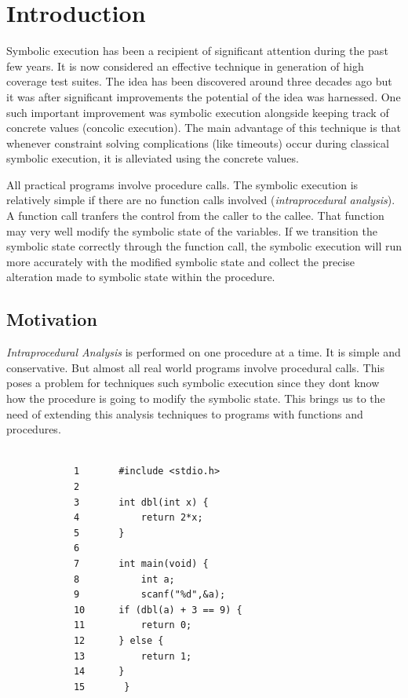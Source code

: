 \documentclass[12pt,oneside]{book}
\begin{document}
\mainmatter


\chapter{Introduction}


\hspace {0.4 cm}
Symbolic execution has been a recipient of significant attention during the past few years. It is now considered an effective technique in generation of high coverage test suites. The idea has been discovered around three decades ago but it was after significant improvements the potential of the idea was harnessed. One such important improvement was symbolic execution alongside keeping track of concrete values (concolic execution)\cite{decadeslater}. The main advantage of this technique is that whenever constraint solving complications (like timeouts) occur during classical symbolic execution, it is alleviated using the concrete values.

All practical programs involve procedure calls. The symbolic execution is relatively simple if there are no function calls involved (\textit{intraprocedural analysis}). A function call tranfers the control from the caller to the callee. That function may very well modify the symbolic state of the variables. If we transition the symbolic state correctly through the function call, the symbolic execution will run more accurately with the modified symbolic state and collect the precise alteration made to symbolic state within the procedure.    


\section{Motivation}
\textit{Intraprocedural Analysis} is performed on one procedure at a time. It is simple and conservative. But almost all real world programs involve procedural calls. This poses a problem for techniques such symbolic execution since they dont know how the procedure is going to modify the symbolic state. This brings us to the need of extending this analysis techniques to programs with functions and procedures.\\

\begin{lstlisting}[caption=Motivational example]

			1		#include <stdio.h>
			2
			3		int dbl(int x) {
			4 			return 2*x;
			5		}
			6
			7		int main(void) {
			8 			int a;
			9			scanf("%d",&a);
			10 		if (dbl(a) + 3 == 9) {
			11	   		return 0;
			12 		} else {
			13	   		return 1;
			14 		}
			15		 }

\end{lstlisting}
\end{document}

